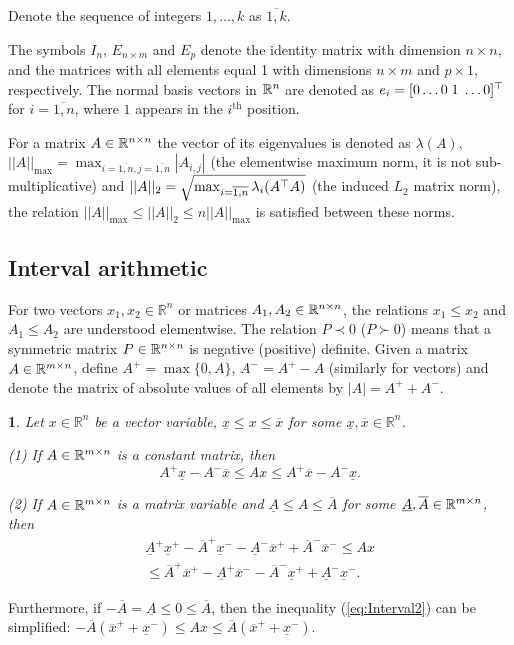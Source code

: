 \documentclass[letterpaper, 10 pt, conference]{ieeeconf}
\theoremstyle{plain}
\newtheorem{lem}{\protect\lemmaname}
\theoremstyle{definition}
\theoremstyle{plain}
\theoremstyle{plain}
\theoremstyle{remark}
\providecommand{\lemmaname}{Lemma}
\begin{document}
Denote the sequence of integers $1,...,k$ as $\overline{1,k}$. 

The symbols $I_{n}$, $E_{n\times m}$ and $E_{p}$ denote the identity matrix with dimension $n\times n$, and the matrices with all elements equal 1 with dimensions $n\times m$ and $p\times1$, respectively. The normal basis vectors in $\mathbb{R}^{n}$ are denoted as $e_{i}=[0\dots0\;1\;\dots0]^{\top}$ for $i=\overline{1,n}$, where $1$ appears in the $i^{\text{th}}$ position.

For a matrix $A\in\mathbb{R}^{n\times n}$ the vector of its eigenvalues is denoted as $\lambda(A)$, $||A||_{\max}=\max_{i=\overline{1,n},j=\overline{1,n}}|A_{i,j}|$ (the elementwise maximum norm, it is not sub-multiplicative) and $||A||_{2}=\sqrt{\max_{i=\overline{1,n}}\lambda_{i}(A^{\top} A)}$ (the induced $L_{2}$ matrix norm), the relation $||A||_{\max}\le||A||_{2}\le n||A||_{\max}$ is satisfied between these norms.

\subsection{Interval arithmetic}

For two vectors $x_{1},x_{2}\in\mathbb{R}^{n}$ or matrices $A_{1},A_{2}\in\mathbb{R}^{n\times n}$, the relations $x_{1}\le x_{2}$ and $A_{1}\le A_{2}$ are understood elementwise. The relation $P\prec0$ ($P\succ0$) means that a symmetric matrix $P\in\mathbb{R}^{n\times n}$ is negative (positive) definite. Given a matrix $A\in\mathbb{R}^{m\times n}$, define $A^{+}=\max\{0,A\}$, $A^{-}=A^{+}-A$ (similarly for vectors) and denote the matrix of absolute values of all elements by $|A|=A^{+}+A^{-}$. 
\begin{lem}
\textup{\cite{EFRZS12}} \label{lem:interval} Let $x\in\mathbb{R}^{n}$ be a vector variable, $\underline{x}\le x\le\overline{x}$ for some $\underline{x},\overline{x}\in\mathbb{R}^{n}$. 

\textup{(1)} If $A\in\mathbb{R}^{m\times n}$ is a constant matrix, then
\begin{equation}
A^{+}\underline{x}-A^{-}\overline{x}\le Ax\le A^{+}\overline{x}-A^{-}\underline{x}.\label{eq:Interval1}
\end{equation}

\textup{(2)} If $A\in\mathbb{R}^{m\times n}$ is a matrix variable and \textup{$\underline{A}\le A\le\overline{A}$} for some $\underline{A},\overline{A}\in\mathbb{R}^{m\times n}$, then
\begin{gather}
\underline{A}^{+}\underline{x}^{+}-\overline{A}^{+}\underline{x}^{-}-\underline{A}^{-}\overline{x}^{+}+\overline{A}^{-}\overline{x}^{-}\leq Ax\label{eq:Interval2}\\
\leq\overline{A}^{+}\overline{x}^{+}-\underline{A}^{+}\overline{x}^{-}-\overline{A}^{-}\underline{x}^{+}+\underline{A}^{-}\underline{x}^{-}.\nonumber 
\end{gather}
\end{lem}
Furthermore, if $-\overline{A}=\underline{A}\le0\le\overline{A}$, then the inequality (\ref{eq:Interval2}) can be simplified: $-\overline{A}(\overline{x}^{+}+\underline{x}^{-})\leq Ax\leq\overline{A}(\overline{x}^{+}+\underline{x}^{-})$.
\end{document}
